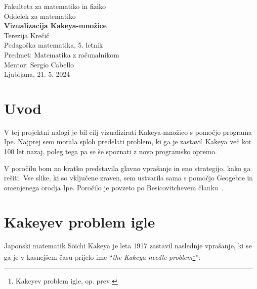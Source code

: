 \documentclass[a4paper, 12pt]{article}
\begin{document}
\begin{titlepage}
    \begin{center}
        \large
        Fakulteta za matematiko in fiziko\\
        Oddelek za matematiko \\
        \vspace{6cm}
        \Huge
        \textbf{Vizualizacija Kakeya-množice} \\
        \vspace{6cm}
        \large
        Terezija Krečič\\
        Pedagoška matematika, 5. letnik\\
        \vspace{1cm}
        Predmet: Matematika z računalnikom \\
        Mentor: Sergio Cabello\\
        \vspace{2cm}
        Ljubljana, 21. 5. 2024
    \end{center}
\end{titlepage}

\newpage



\section*{Uvod}

V tej projektni nalogi je bil cilj vizualizirati Kakeya-množico s pomočjo programa \href{https://ipe.otfried.org/}{Ipe}. Najprej sem morala sploh predelati problem, ki ga je zastavil Kakeya več kot 100 let nazaj, poleg tega pa se še spoznati z novo programsko opremo.

V poročilu bom na kratko predstavila glavno vprašanje in eno strategijo, kako ga rešiti. Vse slike, ki so vključene zraven, sem ustvarila sama s pomočjo Geogebre in omenjenega orodja Ipe. Poročilo je povzeto po Besicovitchevem članku~\cite{Besicovitch}.


\section*{Kakeyev problem igle}

Japonski matematik Sōichi Kakeya je leta 1917 zastavil naslednje vprašanje, ki se ga je v kasnejšem času prijelo ime ``\emph{the Kakeya needle problem}\footnote{Kakeyev problem igle, op. prev.}'':
\end{document}
